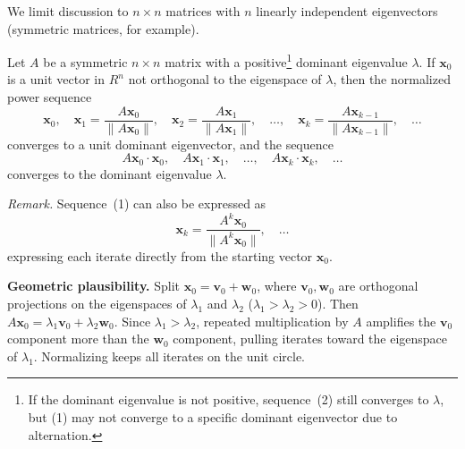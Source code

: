 \documentclass{article}
\begin{document}
We limit discussion to $n\times n$ matrices with $n$ linearly independent eigenvectors
(symmetric matrices, for example).

\begin{tcolorbox}[colback=red!4, colframe=red!60!black,
  title={\textbf{Theorem 9.2.1}}, boxrule=0.5mm, arc=3mm]
Let $A$ be a symmetric $n\times n$ matrix with a positive\footnote{If the dominant
eigenvalue is not positive, sequence~(2) still converges to $\lambda$, but (1) may not
converge to a specific dominant eigenvector due to alternation.} dominant eigenvalue $\lambda$.
If $\mathbf{x}_0$ is a unit vector in $R^n$ not orthogonal to the eigenspace of $\lambda$,
then the normalized power sequence
\begin{equation}
  \mathbf{x}_0,\quad
  \mathbf{x}_1 = \frac{A\mathbf{x}_0}{\|A\mathbf{x}_0\|},\quad
  \mathbf{x}_2 = \frac{A\mathbf{x}_1}{\|A\mathbf{x}_1\|},\quad\ldots,\quad
  \mathbf{x}_k = \frac{A\mathbf{x}_{k-1}}{\|A\mathbf{x}_{k-1}\|},\quad\ldots \tag{1}
\end{equation}
converges to a unit dominant eigenvector, and the sequence
\begin{equation}
  A\mathbf{x}_0\cdot\mathbf{x}_0,\quad A\mathbf{x}_1\cdot\mathbf{x}_1,\quad\ldots,\quad
  A\mathbf{x}_k\cdot\mathbf{x}_k,\quad\ldots \tag{2}
\end{equation}
converges to the dominant eigenvalue $\lambda$.
\end{tcolorbox}

\textit{Remark.} Sequence~(1) can also be expressed as
\begin{equation}
  \mathbf{x}_k = \frac{A^k\mathbf{x}_0}{\|A^k\mathbf{x}_0\|},\quad\ldots \tag{3}
\end{equation}
expressing each iterate directly from the starting vector $\mathbf{x}_0$.

\vspace{2mm}
\textbf{Geometric plausibility.} Split $\mathbf{x}_0 = \mathbf{v}_0 + \mathbf{w}_0$,
where $\mathbf{v}_0,\mathbf{w}_0$ are orthogonal projections on the eigenspaces of
$\lambda_1$ and $\lambda_2$ ($\lambda_1 > \lambda_2 > 0$). Then
$A\mathbf{x}_0 = \lambda_1\mathbf{v}_0 + \lambda_2\mathbf{w}_0$. Since
$\lambda_1 > \lambda_2$, repeated multiplication by $A$ amplifies the $\mathbf{v}_0$
component more than the $\mathbf{w}_0$ component, pulling iterates toward the eigenspace
of $\lambda_1$. Normalizing keeps all iterates on the unit circle.
\end{document}
